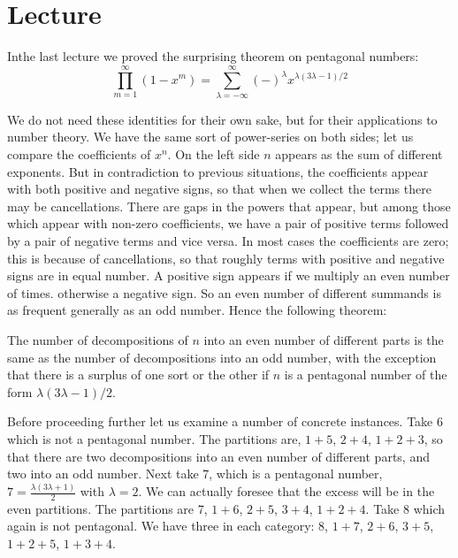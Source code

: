 \chapter{Lecture}\label{part1:lec4}

In\pageoriginale  the last lecture we proved the surprising theorem on pentagonal
numbers:
\begin{equation*}
  \prod^\infty_{m=1} (1- x^m) = \sum^\infty_{\lambda=-\infty}
  (-)^\lambda x^{\lambda (3 \lambda-1)/2} \tag{1}\label{part1:lec4:eq1}
\end{equation*}

We do not need these identities for their own sake, but for their
applications to number theory. We have the same sort of power-series
on both sides; let us compare the coefficients of $x^n$. On the left
side $n$ appears as the sum of different exponents. But in
contradiction to previous situations, the coefficients appear with
both positive and negative signs, so that when we collect the terms
there may be cancellations. There are gaps in the powers that appear,
but among those which appear with non-zero coefficients, we have a
pair of positive terms followed by a pair of negative terms and vice
versa. In most cases the coefficients are zero; this is because of
cancellations, so that roughly terms with positive and negative signs
are in equal number. A positive  sign appears if we multiply an even
number of times. otherwise a negative sign. So an even number of
different summands is as frequent generally as an odd number. Hence
the following theorem:

The number of decompositions of $n$ into an even number of different
parts is the same as the number of decompositions into an odd number,
with the exception that there is a surplus of one sort or the other if
$n$ is a pentagonal number of the form $\lambda (3 \lambda-1)/2$.

Before proceeding further let us examine a number of concrete
instances. Take 6 which is not a pentagonal number. The partitions are, $1+5$, $2+4$, $1+2+3$, so that there are two decompositions into an
even number of different parts, and two into an odd number. Next take
7, which is a pentagonal number, $7= \frac{\lambda(3 \lambda+1)}{2}$
with $\lambda=2$. We can actually foresee that the excess will be in
the even partitions. The partitions are 7, $1+6$, $2+5$, $3+4$,
$1+2+4$. Take 8 which again is not pentagonal. We have three in each
category: 8, $1+7$, $2+6$, $3+5$, $1+2+5$, $1+3+4$.

